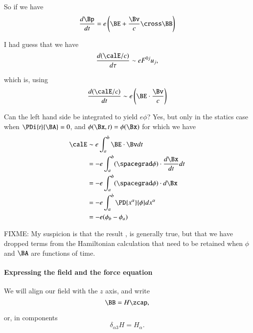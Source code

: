 {So if we have
%
\begin{equation}\label{eqn:relativisticElectrodynamicsT3:920}
\frac{d\Bp}{dt} = e \left( \BE + \frac{\Bv}{c} \cross \BB \right)
\end{equation}

I had guess that we have
%
\begin{equation}\label{eqn:relativisticElectrodynamicsT3:940}
\frac{d(\calE/c)}{d\tau} \sim e F^{0 j} u_j,
\end{equation}

which is, using 
%
\begin{equation}\label{eqn:relativisticElectrodynamicsT3:950}
\frac{d(\calE/c)}{dt} \sim e \left(\BE \cdot \frac{\Bv}{c}\right)
\end{equation}

Can the left hand side be integrated to yield \(e \phi\)?  Yes, but only in the statics case when \(\PDi{t}{\BA} = 0\), and \(\phi(\Bx,t) = \phi(\Bx)\) for which we have
%
\begin{equation}\label{eqn:relativisticElectrodynamicsT3:1110}
\begin{aligned}
\calE
&\sim e \int_a^b \BE \cdot \Bv dt \\
&= -e \int_a^b (\spacegrad \phi) \cdot \frac{d \Bx}{dt} dt \\
&= -e \int_a^b (\spacegrad \phi) \cdot d \Bx \\
&= -e \int_a^b \PD{x^\alpha}{\phi} d x^\alpha \\
&= -e (\phi_b - \phi_a)
\end{aligned}
\end{equation}

FIXME: My suspicion is that the result , is generally true, but that we have dropped terms from the Hamiltonian calculation that need to be retained when \(\phi\) and \(\BA\) are functions of time.

\paragraph{Expressing the field and the force equation}

We will align our field with the \(z\) axis, and write
%
\begin{equation}\label{eqn:relativisticElectrodynamicsT3:560}
\BB = H \zcap,
\end{equation}

or, in components
%
\begin{equation}\label{eqn:relativisticElectrodynamicsT3:580}
\delta_{\alpha 3} H = H_\alpha.
\end{equation}

}
